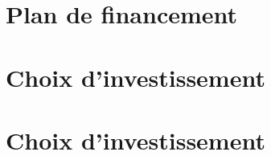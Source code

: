 \documentclass{article}
\begin{document}
	\section{Plan de financement}
	\section{Choix d'investissement}
	\section{Choix d'investissement}
\end{document}
